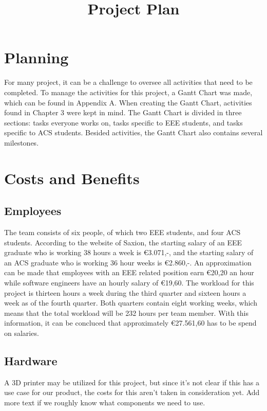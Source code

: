 \documentclass{article}
\title{Project Plan}
\begin{document}
\maketitle
\section{Planning}
For many project, it can be a challenge to oversee all activities that need to be completed. 
To manage the activities for this project, a Gantt Chart was made, which can be found in Appendix A.
When creating the Gantt Chart, activities found in Chapter 3 were kept in mind.
The Gantt Chart is divided in three sections: tasks everyone works on, tasks specific to EEE students, and tasks specific to ACS students.
Besided activities, the Gantt Chart also contains several milestones.

\section{Costs and Benefits}
\subsection*{Employees}
The team consists of six people, of which two EEE students, and four ACS students.
According to the website of Saxion, the starting salary of an EEE graduate who is working 38 hours a week is \euro{}3.071,-, and the starting salary of an ACS graduate who is working 36 hour weeks is \euro{}2.860,-.
An approximation can be made that employees with an EEE related position earn \euro{}20,20 an hour while software engineers have an hourly salary of \euro{}19,60.
The workload for this project is thirteen hours a week during the third quarter and sixteen hours a week as of the fourth quarter.
Both quarters contain eight working weeks, which means that the total workload will be 232 hours per team member.
With this information, it can be concluced that approximately \euro{}27.561,60 has to be spend on salaries.

\subsection*{Hardware}
A 3D printer may be utilized for this project, but since it's not clear if this has a use case for our product, the costs for this aren't taken in consideration yet.
Add more text if we roughly know what components we need to use.
\end{document}
